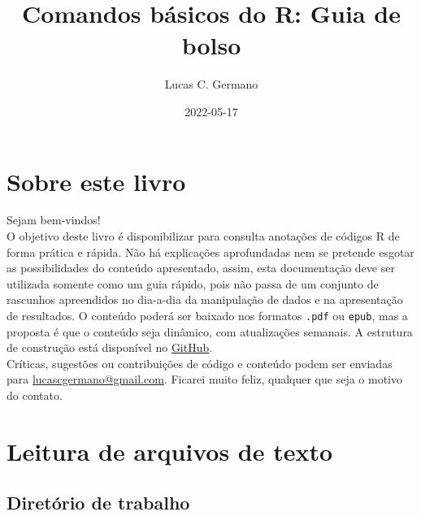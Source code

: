\documentclass[
]{book}
\title{Comandos básicos do R: Guia de bolso}
\author{Lucas C. Germano}
\date{2022-05-17}
\theoremstyle{definition}
\theoremstyle{definition}
\theoremstyle{definition}
\theoremstyle{definition}
\theoremstyle{remark}
\begin{document}
\maketitle

{
\setcounter{tocdepth}{1}
\tableofcontents
}
\hypertarget{sobre-este-livro}{%
\chapter*{Sobre este livro}\label{sobre-este-livro}}

Sejam bem-vindos!\\
O objetivo deste livro é disponibilizar para consulta anotações de códigos R de forma prática e rápida. Não há explicações aprofundadas nem se pretende esgotar as possibilidades do conteúdo apresentado, assim, esta documentação deve ser utilizada somente como um guia rápido, pois não passa de um conjunto de rascunhos apreendidos no dia-a-dia da manipulação de dados e na apresentação de resultados. O conteúdo poderá ser baixado nos formatos \texttt{.pdf} ou \texttt{epub}, mas a proposta é que o conteúdo seja dinâmico, com atualizações semanais. A estrutura de construção está disponível no \href{https://github.com/lucascgmermano/guia_de_bolso.git}{GitHub}.\\
Críticas, sugestões ou contribuições de código e conteúdo podem ser enviadas para \url{lucascgermano@gmail.com}. Ficarei muito feliz, qualquer que seja o motivo do contato.

\hypertarget{leitura-de-arquivos-de-texto}{%
\chapter{Leitura de arquivos de texto}\label{leitura-de-arquivos-de-texto}}

\hypertarget{diretuxf3rio-de-trabalho}{%
\section{Diretório de trabalho}\label{diretuxf3rio-de-trabalho}}
\end{document}

